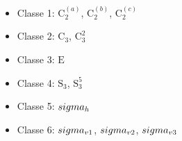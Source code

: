 \begin{itemize}
  \item Classe 1: $\mathrm{C}_{2}^{(a)}$, $\mathrm{C}_{2}^{(b)}$, $\mathrm{C}_{2}^{(c)}$
  \item Classe 2: $\mathrm{C}_{3}$, $\mathrm{C}_{3}^{2}$
  \item Classe 3: $\mathrm{E}$
  \item Classe 4: $\mathrm{S}_{3}$, $\mathrm{S}_{3}^{5}$
  \item Classe 5: $\\sigma_{h}$
  \item Classe 6: $\\sigma_{v1}$, $\\sigma_{v2}$, $\\sigma_{v3}$
\end{itemize}
